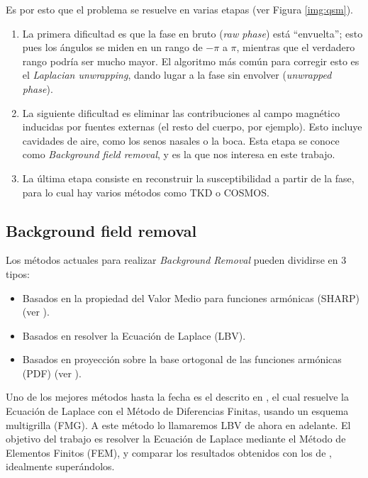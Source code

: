 Es por esto que el problema se resuelve en varias etapas (ver Figura \ref{img:qsm}).

\begin{enumerate}
    \item La primera dificultad es que la fase en bruto (\textit{raw phase}) está ``envuelta''; esto pues los ángulos se miden en un rango de $-\pi$ a $\pi$, mientras que el verdadero rango podría ser mucho mayor. El algoritmo más común para corregir esto es el \textit{Laplacian unwrapping}, dando lugar a la fase sin envolver (\textit{unwrapped phase}). 
    \item La siguiente dificultad es eliminar las contribuciones al campo magnético inducidas por fuentes externas (el resto del cuerpo, por ejemplo). Esto incluye cavidades de aire, como los senos nasales o la boca. Esta etapa se conoce como \textit{Background field removal}, y es la que nos interesa en este trabajo.
    \item La última etapa consiste en reconstruir la susceptibilidad a partir de la fase, para lo cual hay varios métodos como TKD o COSMOS.
\end{enumerate}


\subsection{Background field removal}

Los métodos actuales para realizar \textit{Background Removal} pueden dividirse en 3 tipos:
\begin{itemize}
    \item Basados en la propiedad del Valor Medio para funciones armónicas (SHARP) (ver \cite{sharp}).
    \item Basados en resolver la Ecuación de Laplace (LBV).
    \item Basados en proyección sobre la base ortogonal de las funciones armónicas (PDF) (ver \cite{pdf}).
\end{itemize}

Uno de los mejores métodos hasta la fecha es el descrito en \cite{lbv_fmg}, el cual resuelve la Ecuación de Laplace con el Método de Diferencias Finitas, usando un esquema multigrilla (FMG). A este método lo llamaremos LBV de ahora en adelante. El objetivo del trabajo es resolver la Ecuación de Laplace mediante el Método de Elementos Finitos (FEM), y comparar los resultados obtenidos con los de \cite{lbv_fmg}, idealmente superándolos.

